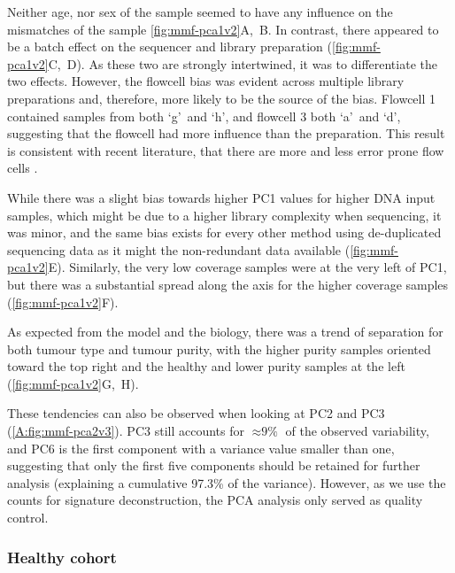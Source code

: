 Neither  age, nor sex of the sample seemed to have any influence on the mismatches of the sample \autoref{fig:mmf-pca1v2}A,~B. In contrast, there appeared to be a batch effect  on the sequencer and library preparation (\autoref{fig:mmf-pca1v2}C,~D). As these two are strongly intertwined, it was  to differentiate the two effects. However, the flowcell bias was evident across multiple library preparations and, therefore, more likely to be the source of the bias. Flowcell 1 contained samples from both \lq g\rq\ and \lq h\rq, and  flowcell 3 both \lq a\rq\ and \lq d\rq, suggesting that the flowcell had more influence than the preparation. This result is consistent with recent literature,  that there are more and less error prone flow cells \cite{Stoler2021}.

While there was a slight bias towards higher PC1 values for higher DNA input samples, which might be due to a higher library complexity when sequencing, it was minor, and the same bias exists for every other method using de-duplicated sequencing data as it might  the non-redundant data available (\autoref{fig:mmf-pca1v2}E). Similarly, the very low coverage samples were at the very left of PC1, but there was a substantial spread along the axis for the higher coverage samples (\autoref{fig:mmf-pca1v2}F). 

As expected from the model and the biology, there was a trend of separation for both tumour type and tumour purity, with the higher purity samples oriented toward the top right and the healthy and lower purity samples at the left (\autoref{fig:mmf-pca1v2}G,~H).

These tendencies can also be observed when looking at PC2 and PC3 (\autoref{A:fig:mmf-pca2v3}). PC3 still accounts for $\approx \text{9\%}$ of the observed variability, and PC6 is the first component with a variance value smaller than one, suggesting that only the first five components should be retained for further analysis (explaining a cumulative 97.3\% of the variance). However, as we use the counts for signature deconstruction, the PCA analysis only served as quality control.


\subsubsection{Healthy cohort}
\label{mmf-sec:healthy}

